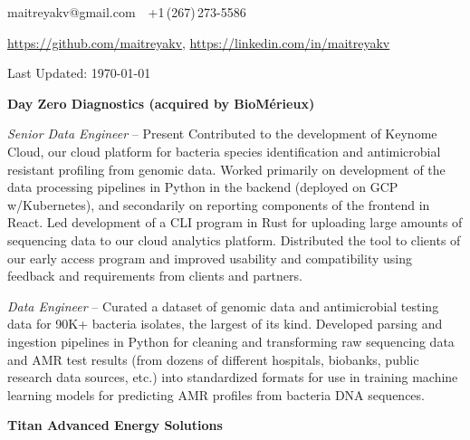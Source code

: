 \documentclass[letterpaper,MMMyyyy,nonstopmode]{simpleresumecv}
\newcommand{\CVAuthor}{Maitreya Venkataswamy}
\newcommand{\CVWebpage}{}
\begin{document}
\Title{\CVAuthor}

\begin{SubTitle}
maitreyakv@gmail.com
\,\SubBulletSymbol\,
+1\,(267)\,273-5586
\,
\href{\CVWebpage}
{\url{\CVWebpage}}
\par
\url{https://github.com/maitreyakv}, \url{https://linkedin.com/in/maitreyakv}
\par
Last Updated: \today
\end{SubTitle}

\begin{Body}


\Entry \textbf{Day Zero Diagnostics (acquired by BioM\'erieux)}

\Gap

\BulletItem \textit{Senior Data Engineer}
\hfill
{} -- Present
\SubBulletItem
  Contributed to the development of Keynome Cloud, our cloud platform for bacteria species identification and antimicrobial resistant profiling from genomic data. Worked primarily on development of the data processing pipelines in Python in the backend (deployed on GCP w/Kubernetes), and secondarily on reporting components of the frontend in React.
\SubBulletItem
Led development of a CLI program in Rust for uploading large amounts of sequencing data to our cloud analytics platform. Distributed the tool to clients of our early access program and improved usability and compatibility using feedback and requirements from clients and partners. 

\Gap

\BulletItem \textit{Data Engineer}
\hfill
{} -- 
\SubBulletItem
Curated a dataset of genomic data and antimicrobial testing data for 90K+ bacteria isolates, the largest of its kind. Developed parsing and ingestion pipelines in Python for cleaning and transforming raw sequencing data and AMR test results (from dozens of different hospitals, biobanks, public research data sources, etc.) into standardized formats for use in training machine learning models for predicting AMR profiles from bacteria DNA sequences.

\BigGap

\Entry \textbf{Titan Advanced Energy Solutions}

\Gap


\end{Body}
\end{document}
